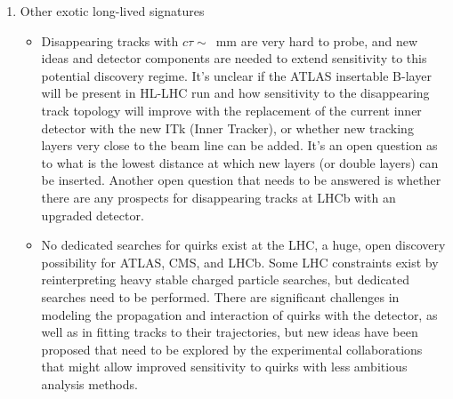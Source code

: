 \begin{enumerate}
\item Other exotic long-lived signatures
	\begin{itemize}
	\item Disappearing tracks with $c \tau \sim$~mm are very hard to probe, and new ideas and detector components are needed to extend sensitivity to this potential discovery regime. It's unclear if the ATLAS insertable B-layer will be present in HL-LHC run and how sensitivity to the disappearing track topology will improve with the replacement of the current inner detector with the new ITk (Inner Tracker), or whether new tracking layers very close to the beam line can be added. It's an open question as to what is the lowest distance at which new layers (or double layers) can be inserted. Another open question that needs to be answered is whether there are any prospects for disappearing tracks at LHCb with an upgraded detector.
	\item No dedicated searches for quirks exist at the LHC, a huge, open discovery possibility for ATLAS, CMS, and LHCb. Some LHC constraints exist by reinterpreting heavy stable charged particle searches, but dedicated searches need to be performed. There are significant challenges in modeling the propagation and interaction of quirks with the detector, as well as in fitting tracks to their trajectories, but new ideas have been proposed that need to be explored by the experimental collaborations that might allow improved sensitivity to quirks with less ambitious analysis methods.
	\end{itemize}
\end{enumerate}

